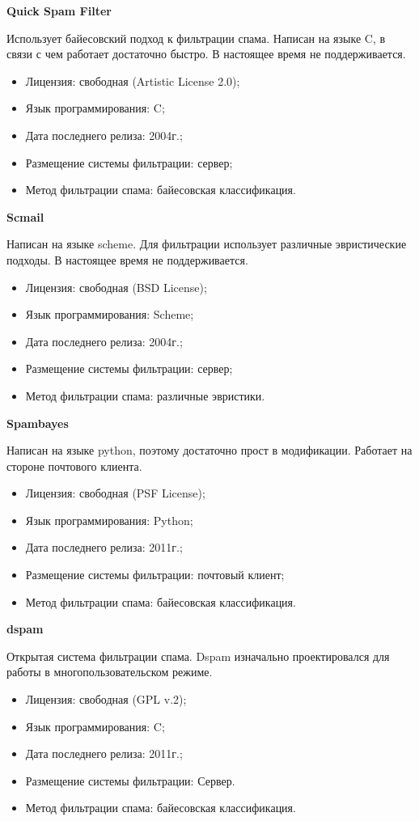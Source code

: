 \textbf{Quick Spam Filter}

Использует байесовский подход к фильтрации спама. Написан на языке C, в связи с чем работает достаточно быстро. В настоящее время не поддерживается.
\begin{itemize}
\item Лицензия: свободная (Artistic License 2.0);
\item Язык программирования: C;
\item Дата последнего релиза: 2004г.;
\item Размещение системы фильтрации: сервер;
\item Метод фильтрации спама: байесовская классификация.
\end{itemize}

\textbf{Scmail}

Написан на языке scheme. Для фильтрации использует различные эвристические подходы. В настоящее время не поддерживается.
\begin{itemize}
\item Лицензия: свободная (BSD License);
\item Язык программирования: Scheme;
\item Дата последнего релиза: 2004г.;
\item Размещение системы фильтрации: сервер;
\item Метод фильтрации спама: различные эвристики.
\end{itemize}

\textbf{Spambayes}

Написан на языке python, поэтому достаточно прост в модификации. Работает на стороне почтового клиента.

\begin{itemize}
\item Лицензия: свободная (PSF License);
\item Язык программирования: Python;
\item Дата последнего релиза: 2011г.;
\item Размещение системы фильтрации: почтовый клиент;
\item Метод фильтрации спама: байесовская классификация.
\end{itemize}



\textbf{dspam} 

Открытая система фильтрации спама. Dspam изначально проектировался для работы в многопользовательском режиме.
\begin{itemize}
\item Лицензия: свободная (GPL v.2);
\item Язык программирования: C;
\item Дата последнего релиза: 2011г.;
\item Размещение системы фильтрации: Сервер.
\item Метод фильтрации спама: байесовская классификация.
\end{itemize}

